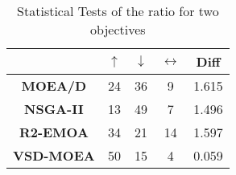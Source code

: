 
\begin{table}[t]
\centering
\caption{Statistical Tests of the ratio \HV{} for two objectives}
\label{tab:Tests_HV_2obj}

\begin{tabular}{c c|c|c|c}
\cline{2-5}
                                        & \textbf{$\uparrow$} & \textbf{$\downarrow$} & \textbf{$\leftrightarrow$} & \textbf{Diff} \\ \hline
\multicolumn{1}{c|}{\textbf{MOEA/D}}   & 24                  & 36                    & 9                          & 1.615         \\ \hline
\multicolumn{1}{c|}{\textbf{NSGA-II}}  & 13                  & 49                    & 7                          & 1.496         \\ \hline
\multicolumn{1}{c|}{\textbf{R2-EMOA}}  & 34                  & 21                    & 14                         & 1.597         \\ \hline
\multicolumn{1}{c|}{\textbf{VSD-MOEA}} & 50                  & 15                    & 4                          & 0.059         \\ \hline
\end{tabular}%
\end{table}


%
